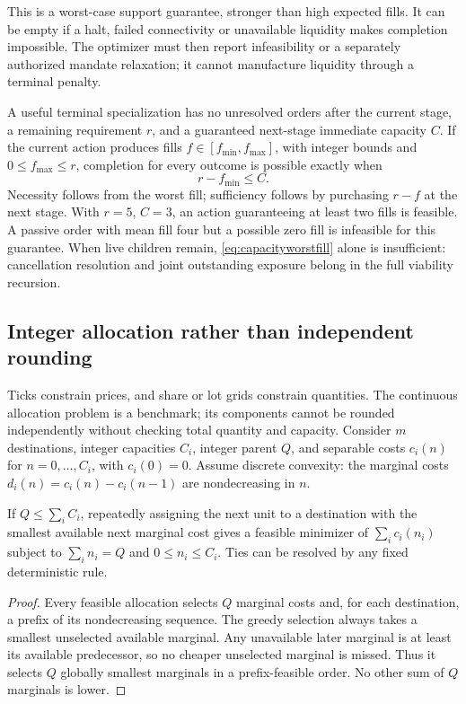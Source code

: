 This is a worst-case support guarantee, stronger than high expected fills.
It can be empty if a halt, failed connectivity or unavailable liquidity
makes completion impossible. The optimizer must then report infeasibility
or a separately authorized mandate relaxation; it cannot manufacture
liquidity through a terminal penalty.

A useful terminal specialization has no unresolved orders after the current
stage, a remaining requirement $r$, and a guaranteed next-stage immediate
capacity $C$. If the current action produces fills
$f\in[f_{\min},f_{\max}]$, with integer bounds and $0\le f_{\max}\le r$,
completion for every outcome is possible exactly when
\begin{equation}\label{eq:capacityworstfill}
 r-f_{\min}\le C.
\end{equation}
Necessity follows from the worst fill; sufficiency follows by purchasing
$r-f$ at the next stage. With $r=5$, $C=3$, an action guaranteeing at least
two fills is feasible. A passive order with mean fill four but a possible
zero fill is infeasible for this guarantee. When live children remain,
\eqref{eq:capacityworstfill} alone is insufficient: cancellation resolution
and joint outstanding exposure belong in the full viability recursion.

\subsection{Integer allocation rather than independent rounding}

Ticks constrain prices, and share or lot grids constrain quantities. The
continuous allocation problem is a benchmark; its components cannot be
rounded independently without checking total quantity and capacity.
Consider $m$ destinations, integer capacities $C_i$, integer parent $Q$,
and separable costs $c_i(n)$ for $n=0,\ldots,C_i$, with $c_i(0)=0$.
Assume discrete convexity: the marginal costs
$d_i(n)=c_i(n)-c_i(n-1)$ are nondecreasing in $n$.

\begin{classical}
\label{prop:integerallocation}
If $Q\le\sum_i C_i$, repeatedly assigning the next unit to a destination
with the smallest available next marginal cost gives a feasible minimizer
of $\sum_i c_i(n_i)$ subject to $\sum_i n_i=Q$ and $0\le n_i\le C_i$.
Ties can be resolved by any fixed deterministic rule.
\end{classical}
\begin{proof}
Every feasible allocation selects $Q$ marginal costs and, for each
destination, a prefix of its nondecreasing sequence. The greedy selection
always takes a smallest unselected available marginal. Any unavailable
later marginal is at least its available predecessor, so no cheaper
unselected marginal is missed. Thus it selects $Q$ globally smallest
marginals in a prefix-feasible order. No other sum of $Q$ marginals is lower.
\end{proof}

